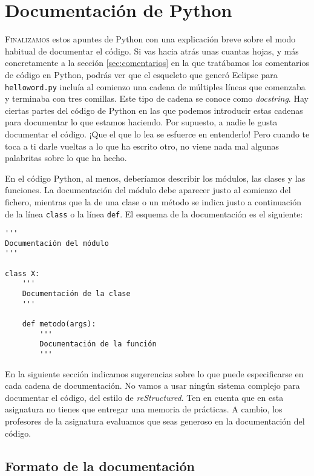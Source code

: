 
\chapter{Documentación de Python}

\lettrine[lines=5]{F}{inalizamos} estos apuntes de Python con una explicación breve sobre el modo habitual de documentar el código. Si vas hacia atrás unas cuantas hojas, y más concretamente a la sección \ref{sec:comentarios} en la que tratábamos los comentarios de código en Python, podrás ver que el esqueleto que generó Eclipse para \texttt{helloword.py} incluía al comienzo una cadena de múltiples líneas que comenzaba y terminaba con tres comillas. Este tipo de cadena se conoce como \emph{docstring}. Hay ciertas partes del código de Python en las que podemos introducir estas cadenas para documentar lo que estamos haciendo. Por supuesto, a nadie le gusta documentar el código. ¡Que el que lo lea se esfuerce en entenderlo! Pero cuando te toca a ti darle vueltas a lo que ha escrito otro, no viene nada mal algunas palabritas sobre lo que ha hecho. 

En el código Python, al menos, deberíamos describir los módulos, las clases y las funciones. La documentación del módulo debe aparecer justo al comienzo del fichero, mientras que la de una clase o un método se indica justo a continuación de la línea \texttt{class} o la línea \texttt{def}. El esquema de la documentación es el siguiente:

\begin{lstlisting}
'''
Documentación del módulo
'''

class X:
    '''
    Documentación de la clase
    '''

    def metodo(args):
        '''
        Documentación de la función
        '''
\end{lstlisting}

En la siguiente sección indicamos sugerencias sobre lo que puede especificarse en cada cadena de documentación. No vamos a usar ningún sistema complejo para documentar el código, del estilo de \emph{reStructured}. Ten en cuenta que en esta asignatura no tienes que entregar una memoria de prácticas. A cambio, los profesores de la asignatura evaluamos que seas generoso en la documentación del código.

\section{Formato de la documentación}

